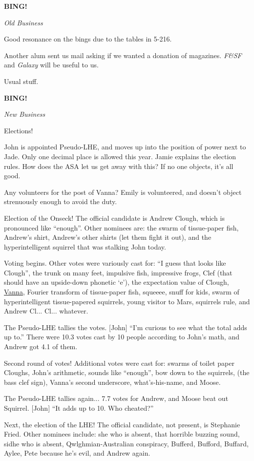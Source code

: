 \documentclass[12pt]{article}
\newcommand{\bing}{{\bf BING!} }
\newcommand{\goto}[1]{\bing \vskip 12pt \centerline{{\em{#1}}}}
\begin{document}
\goto{Old Business}

Good resonance on the bings due to the tables in 5-216.

Another alum sent us mail asking if we wanted a donation of magazines.
{\em F\&SF} and {\em Galaxy} will be useful to us.

Usual stuff.

\goto{New Business}

Elections!

John is appointed Pseudo-LHE, and moves up into the position of power
next to Jade.  Only one decimal place is allowed this year.  Jamie
explains the election rules.  How does the ASA let us get away with this?
If no one objects, it's all good.

Any volunteers for the post of Vanna?  Emily is volunteered, and doesn't
object strenuously enough to avoid the duty.

Election of the Onseck!  The official candidate is Andrew Clough, which
is pronounced like ``enough''.  Other nominees are: the swarm of tissue-paper
fish, Andrew's shirt, Andrew's other shirts (let them fight it out), and
the hyperintelligent squirrel that was stalking John today.

Voting begins.  Other votes were variously cast for: ``I guess that looks
like Clough'', the trunk on many feet, impulsive fish, impressive frogs,
Clef (that should have an upside-down phonetic `e'), the expectation value
of Clough, \underline{\underline{Vanna}}, Fourier transform of tissue-paper
fish, squeeee, snuff for kids, swarm of hyperintelligent tissue-papered
squirrels, young visitor to Mars, squirrels rule, and Andrew Cl... Cl...
whatever.

The Pseudo-LHE tallies the votes.  [John] ``I'm curious to see what the
total adds up to.''  There were 10.3 votes cast by 10 people according to
John's math, and Andrew got 4.1 of them.

Second round of votes!  Additional votes were cast for: swarms of toilet
paper Cloughs, John's arithmetic, sounds like ``enough'', bow down to the
squirrels, (the bass clef sign), Vanna's second underscore, what's-his-name,
and Moose.

The Pseudo-LHE tallies again... 7.7 votes for Andrew, and Moose beat out
Squirrel.  [John] ``It adds up to 10.  Who cheated?''

Next, the election of the LHE!  The official candidate, not present, is
Stephanie Fried.  Other nominees include: she who is absent, that horrible
buzzing sound, sidhe who is absent, Qwlghmian-Australian conspiracy,
Bufferd, Bufford, Buffard, Aylee, Pete because he's evil, and Andrew again.
\end{document}

